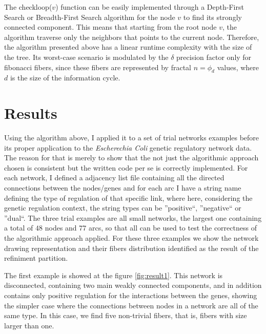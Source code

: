 \documentclass[12pt]{diazessay} %
\begin{document}
The checkloop($v$) function can be easily implemented through a Depth-First Search or Breadth-First Search algorithm for the node $v$ to find its strongly connected component. This means that starting from the root node $v$, the algorithm traverse only the neighbors that points to the current node. Therefore, the algorithm presented above has a linear runtime complexity with the size of the tree. Its worst-case scenario is modulated by the $\delta$ precision factor only for fibonacci fibers, since these fibers are represented by fractal $n = \phi_d$ values, where $d$ is the size of the information cycle.


\section*{Results}

Using the algorithm above, I applied it to a set of trial networks examples before its proper application to the \textit{Escherechia Coli} genetic regulatory network data. The reason for that is merely to show that the not just the algorithmic approach chosen is consistent but the written code per se is correctly implemented. For each network, I defined a adjacency list file containing all the directed connections between the nodes/genes and for each arc I have a string name defining the type of regulation of that specific link, where here, considering the genetic regulation context, the string types can be ''positive``, ''negative`` or ''dual``. The three trial examples are all small networks, the largest one containing a total of $48$ nodes and $77$ arcs, so that all can be used to test the correctness of the algorithmic approach applied. For these three examples we show the network drawing representation and their fibers distribution identified as the result of the refiniment partition.

The first example is showed at the figure \ref{fig:result1}. This network is disconnected, containing two main weakly connected components, and in addition contains only positive regulation for the interactions between the genes, showing the simpler case where the connections between nodes in a network are all of the same type. In this case, we find five non-trivial fibers, that is, fibers with size larger than one.
\end{document}
